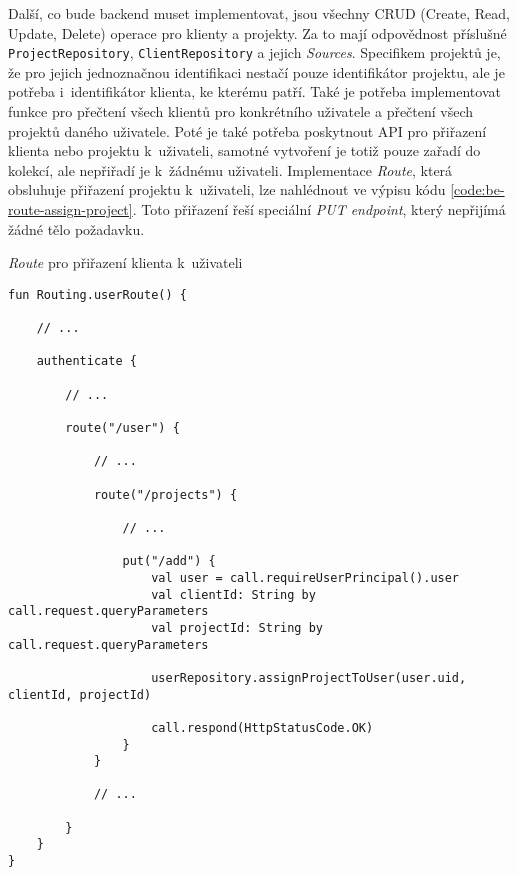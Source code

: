 Další, co bude backend muset implementovat, jsou všechny CRUD (Create, Read, Update, Delete) operace pro klienty a projekty. Za to mají odpovědnost příslušné \texttt{ProjectRepository}, \texttt{ClientRepository} a jejich \emph{Sources}. Specifikem projektů je, že pro jejich jednoznačnou identifikaci nestačí pouze identifikátor projektu, ale je potřeba i~identifikátor klienta, ke kterému patří. Také je potřeba implementovat funkce pro přečtení všech klientů pro konkrétního uživatele a přečtení všech projektů daného uživatele. Poté je také potřeba poskytnout API pro přiřazení klienta nebo projektu k~uživateli, samotné vytvoření je totiž pouze zařadí do kolekcí, ale nepřiřadí je k~žádnému uživateli. Implementace \emph{Route}, která obsluhuje přiřazení projektu k~uživateli, lze nahlédnout ve výpisu kódu \ref{code:be-route-assign-project}. Toto přiřazení řeší speciální \emph{PUT endpoint}, který nepřijímá žádné tělo požadavku.

\begin{listing}
\caption{\emph{Route} pro přiřazení klienta k~uživateli}\label{code:be-route-assign-project}
\begin{verbatim}
fun Routing.userRoute() {

    // ...
    
    authenticate {
    
        // ...
        
        route("/user") {
        
            // ...
            
            route("/projects") {
            
                // ...
                
                put("/add") {
                    val user = call.requireUserPrincipal().user
                    val clientId: String by call.request.queryParameters
                    val projectId: String by call.request.queryParameters

                    userRepository.assignProjectToUser(user.uid, clientId, projectId)

                    call.respond(HttpStatusCode.OK)
                }
            }
            
            // ...
            
        }
    }
}
\end{verbatim}
\end{listing}

